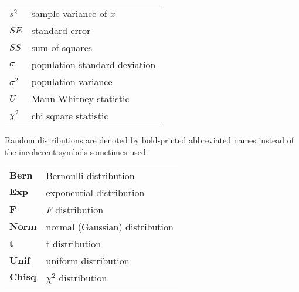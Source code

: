 \begin{longtable}{p{}p{}}
  $s^2$             & sample variance of $x$ \\ 
  $SE$              & standard error \\
  $SS$              & sum of squares \\
  $\sigma$          & population standard deviation \\
  $\sigma^2$        & population variance \\ 
  $U$               & Mann-Whitney statistic \\
  $\chi^2$          & chi square statistic \\
\end{longtable} 

\vspace{\baselineskip}
\noindent Random distributions are denoted by bold-printed abbreviated names instead of the incoherent symbols sometimes used.
\vspace{\baselineskip}

\begin{longtable}{p{}p{}}
  $\mathbf{Bern}$   & Bernoulli distribution \\
  $\mathbf{Exp}$    & exponential distribution \\
  $\mathbf{F}$      & $F$ distribution \\
  $\mathbf{Norm}$   & normal (Gaussian) distribution \\
  $\mathbf{t}$      & t distribution \\
  $\mathbf{Unif}$   & uniform distribution \\
  $\mathbf{Chisq}$  & $\chi^2$ distribution \\
\end{longtable} 
